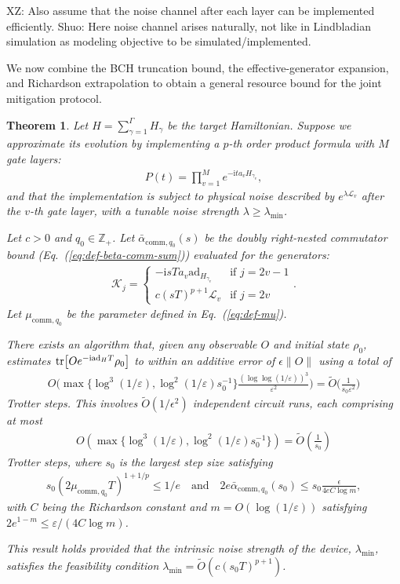 \documentclass[11pt]{article}
\newtheorem{theorem}{Theorem}
\newcommand{\eq}[1]{(\ref{eq:#1})}
\renewcommand{\i}{\mathrm{i}}
\renewcommand{\L}{\mathcal{L}}
\newcommand{\ad}{\mathrm{ad}}
\newcommand{\eps}{\varepsilon}
\newcommand{\mb}{\mathbb}
\newcommand{\xz}[1]{{\color{cyan} XZ: #1}}
\newcommand{\sz}[1]{{\color{blue} Shuo: #1}}
\begin{document}
\xz{Also assume that the noise channel after each layer can be implemented efficiently. }
\sz{Here noise channel arises naturally, not like in Lindbladian simulation as modeling objective to be simulated/implemented.}

We now combine the BCH truncation bound, the effective-generator expansion, and Richardson extrapolation to obtain a general resource bound for the joint mitigation protocol.
\begin{theorem}
\label{thm:general-application}
    Let $H = \sum_{\gamma = 1}^{\Gamma} H_{\gamma}$ be the target Hamiltonian. Suppose we approximate its evolution by implementing a $p$-th order product formula with $M$ gate layers:
    \begin{align*}
        P(t) = \prod_{v=1}^M e^{-\i t a_v H_{\gamma_v}},
    \end{align*}
    and that the implementation is subject to physical noise described by $e^{\lambda \L_v}$ after the $v$-th gate layer, with a tunable noise strength $\lambda \ge \lambda_{\min}$.
    
    Let $c>0$ and $q_0\in \mb Z_+$. Let $\bar{\alpha}_{\mathrm{comm},q_0}(s)$ be the doubly right-nested commutator bound (Eq.~\eq{def-beta-comm-sum}) evaluated for the generators:
    \begin{align*}
        \mathcal{K}_j= \begin{cases}-\i sT a_{v}\ad_{H_{\gamma_v}} & \text{if } j = 2v-1\\ c(sT)^{p+1}\mathcal{L}_v & \text{if } j = 2v \end{cases}.
    \end{align*}
    Let $\mu_{\mathrm{comm},q_0}$ be the parameter defined in Eq.~\eq{def-mu}. 
    
    There exists an algorithm that, given any observable $O$ and initial state $\rho_0$, estimates $\tr[O e^{-\i \ad_H T}\rho_0]$ to within an additive error of $\epsilon\|O\|$ using a total of \begin{align*}
        O\Big( \max\{\log^3(1/\eps), \log^2(1/\eps)s_0^{-1}\}\frac{(\log\log (1/\eps))^3}{\eps^2}\Big)  = \widetilde{O}\Big(\frac{1}{s_0 \eps^2}\Big)
    \end{align*}Trotter steps. This involves $\widetilde{O}(1/\epsilon^2)$ independent circuit runs, each comprising at most 
    \begin{align*}
        O( \max\{\log^3(1/\eps), \log^2(1/\eps)s_0^{-1}\}) = \widetilde{O}\left( \frac{1}{s_0} \right)
    \end{align*} Trotter steps,
    where $s_0$ is the largest step size satisfying
    \begin{align} \label{eq:s0-general}
       s_0 (2\mu_{\mathrm{comm},q_0}T)^{1+1/p} \le 1/e \quad \text{and} \quad
       2e \bar{\alpha}_{\mathrm{comm},q_0}(s_0) \le s_0 \frac{\epsilon}{4eC\log m},
    \end{align}
    with $C$ being the Richardson constant and $m = O(\log(1/\eps))$ satisfying $2e^{1-m} \le \eps /(4C\log m)$.
    
    This result holds provided that the intrinsic noise strength of the device, $\lambda_{\min}$, satisfies the feasibility condition $\lambda_{\min} = \widetilde{O}(c (s_0 T)^{p+1})$.
\end{theorem}
\end{document}
